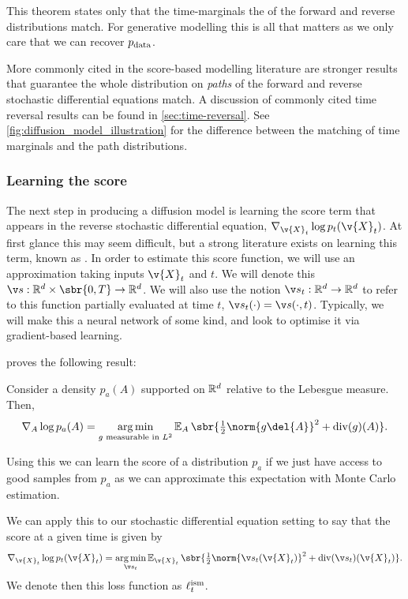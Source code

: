 This theorem states only that the time-marginals the of the forward and reverse distributions match.
For generative modelling this is all that matters as we only care that we can recover \(p_{\text{data}}\).

More commonly cited in the score-based modelling literature are stronger results that guarantee the whole distribution on \emph{paths} of the forward and reverse stochastic differential equations match.
A discussion of commonly cited time reversal results can be found in \cref{sec:time-reversal}.
See \cref{fig:diffusion_model_illustration} for the difference between the matching of time marginals and the path distributions.

\subsubsection{Learning the score}

The next step in producing a diffusion model is learning the score term that appears in the reverse stochastic differential equation, \(\nabla_{\v{X}_t} \log p_t(\v{X}_t)\).
At first glance this may seem difficult, but a strong literature exists on learning this term, known as .
In order to estimate this score function, we will use an approximation taking inputs \(\v{X}_t\) and \(t\).
We will denote this \(\scorenet{}: \R^d \times \sbr{0, T} \to \R^d\).
We will also use the notion \(\scorenett{} : \R^d \to \R^d\) to refer to this function partially evaluated at time \(t\), \(\scorenett{}(\cdot) = \scorenet(\cdot, t)\).
Typically, we will make this a neural network of some kind, and look to optimise it via gradient-based learning.

\textcite{hyvarinen05a} proves the following result:
\begin{theorem}
	\label{def:ism}
	Consider a density \(p_a(A)\) supported on \(\mathbb{R}^d\) relative to the Lebesgue measure.
	Then,
	\[\nabla_{A} \log p_a(A) = \argmin_{g\text{ measurable in }L^2} \E_{A}\sbr{ { \tfrac{1}{2} \norm{g\del{A}}^2 + \dive(g)(A)}}.\]
\end{theorem}
Using this we can learn the score of a distribution \(p_a\) if we just have access to good samples from \(p_a\) as we can approximate this expectation with Monte Carlo estimation.

We can apply this to our stochastic differential equation setting to say that the score at a given time is given by \[\nabla_{\v{X}_t} \log p_t(\v{X}_t) = \argmin_{\scorenett{}} \E_{\v{X}_t} \sbr{ \tfrac{1}{2} \norm{\scorenett{}(\v{X}_t)}^2 + \dive(\scorenett{})(\v{X}_t)}.\]
We denote then this loss function as \(\ell^{\text{ism}}_t{}\).

